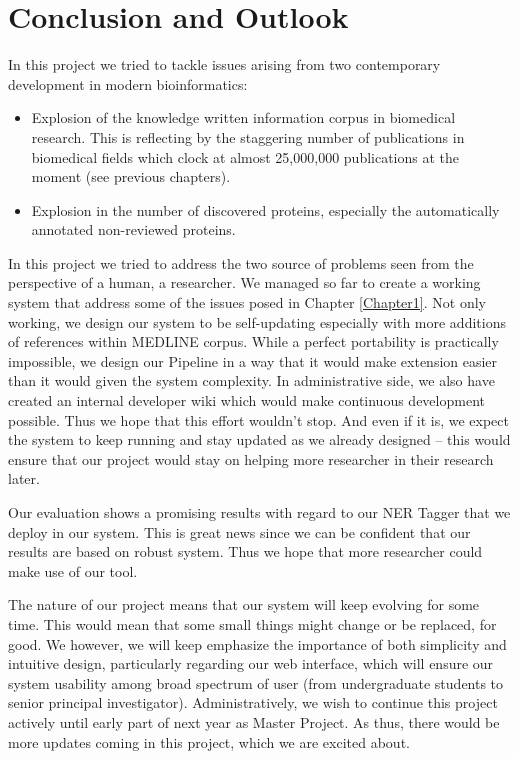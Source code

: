 
\chapter{Conclusion and Outlook} %

\label{Chapter8} %


In this project we tried to tackle issues arising from two contemporary development in modern bioinformatics:

\begin{itemize}
\item Explosion of the knowledge written information corpus in biomedical research. This is reflecting by the staggering number of publications in biomedical fields which clock at almost 25,000,000 publications at the moment (see previous chapters).

\item Explosion in the number of discovered proteins, especially the automatically annotated non-reviewed proteins.
\end{itemize}

In this project we tried to address the two source of problems seen from the perspective of a human, a researcher. We managed so far to create a working system that address some of the issues posed in Chapter \ref{Chapter1}. Not only working, we design our system to be self-updating especially with more additions of references within MEDLINE corpus. While a perfect portability is practically impossible, we design our Pipeline in a way that it would make extension easier than it would given the system complexity. In administrative side, we also have created an internal developer wiki which would make continuous development possible. Thus we hope that this effort wouldn't stop. And even if it is, we expect the system to keep running and stay updated as we already designed -- this would ensure that our project would stay on helping more researcher in their research later.

Our evaluation shows a promising results with regard to our NER Tagger that we deploy in our system. This is great news since we can be confident that our results are based on robust system. Thus we hope that more researcher could make use of our tool.

The nature of our project means that our system will keep evolving for some time. This would mean that some small things might change or be replaced, for good. We however, we will keep emphasize the importance of both simplicity and intuitive design, particularly regarding our web interface, which will ensure our system usability among broad spectrum of user (from undergraduate students to senior principal investigator). Administratively, we wish to continue this project actively until early part of next year as Master Project. As thus, there would be more updates coming in this project, which we are excited about.